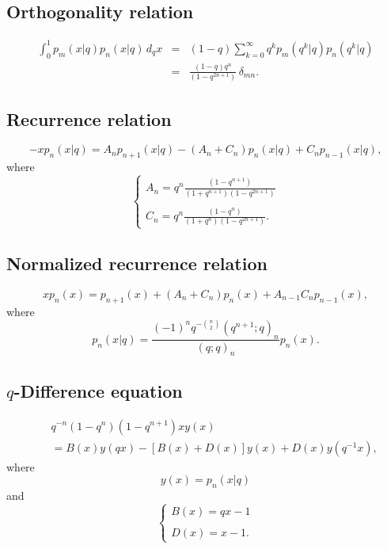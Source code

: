 \documentclass[envcountchap,graybox]{svmono}
\begin{document}
\subsection*{Orthogonality relation}
\begin{eqnarray}
\label{OrtLittleqLegendre}
\int_0^1p_m(x|q)p_n(x|q)\,d_qx&=&(1-q)\sum_{k=0}^{\infty}q^kp_m(q^k|q)p_n(q^k|q)\nonumber\\
&=&\frac{(1-q)q^n}{(1-q^{2n+1})}\,\delta_{mn}.
\end{eqnarray}

\subsection*{Recurrence relation}
\begin{equation}
\label{RecLittleqLegendre}
-xp_n(x|q)=A_np_{n+1}(x|q)-\left(A_n+C_n\right)p_n(x|q)+C_np_{n-1}(x|q),
\end{equation}
where
$$\left\{\begin{array}{l}
\displaystyle A_n=q^n\frac{(1-q^{n+1})}{(1+q^{n+1})(1-q^{2n+1})}\\
\\
\displaystyle C_n=q^n\frac{(1-q^n)}{(1+q^n)(1-q^{2n+1})}.
\end{array}\right.$$

\subsection*{Normalized recurrence relation}
\begin{equation}
\label{NormRecLittleqLegendre}
xp_n(x)=p_{n+1}(x)+(A_n+C_n)p_n(x)+A_{n-1}C_np_{n-1}(x),
\end{equation}
where
$$p_n(x|q)=\frac{(-1)^nq^{-\binom{n}{2}}(q^{n+1};q)_n}{(q;q)_n}p_n(x).$$

\subsection*{$q$-Difference equation}
\begin{eqnarray}
\label{dvLittleqLegendre}
& &q^{-n}(1-q^n)(1-q^{n+1})xy(x)\nonumber\\
& &{}=B(x)y(qx)-\left[B(x)+D(x)\right]y(x)+D(x)y(q^{-1}x),
\end{eqnarray}
where
$$y(x)=p_n(x|q)$$
and
$$\left\{\begin{array}{l}\displaystyle B(x)=qx-1\\
\\
\displaystyle D(x)=x-1.\end{array}\right.$$
\end{document}
